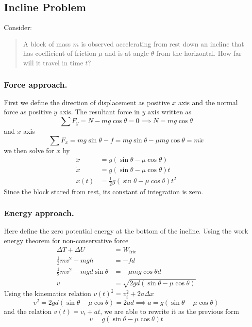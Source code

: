 \documentclass[../../../main.tex]{subfiles}
\begin{document}
\subsection{Incline Problem}
Consider:
\begin{quotation}
    A block of mass $m$ is observed accelerating from rest down an incline that has coefficient of friction $\mu$ and is at angle $\theta$ from the horizontal. How far will it travel in time $t$?
\end{quotation}
\begin{figure*}[h]
    \centering
\end{figure*}

\subsubsection{Force approach.}
First we define the direction of displacement as positive $x$ axis and the normal force as positive $y$ axis. The resultant force in $y$ axis written as 
\begin{equation*}
    \sum F_y=N-mg\cos\theta=0 \implies N=mg\cos \theta
\end{equation*}
and $x$ axis
\begin{equation*}
    \sum F_x=mg\sin\theta -f= mg\sin\theta -\mu mg\cos \theta=m\ddot{x}
\end{equation*}
we then solve for $x$ by 
\begin{align*}
    \ddot{x}&=g\left(\sin\theta -\mu \cos \theta\right)\\
    \dot{x}&=g\left(\sin\theta -\mu \cos \theta\right)t\\
    x(t)&=\frac{1}{2}g\left(\sin\theta -\mu \cos \theta\right)t^2
\end{align*}
Since the block stared from rest, its constant of integration is zero.

\subsubsection{Energy approach.}
Here define the zero potential energy at the bottom of the incline. 
Using the work energy theorem for non-conservative force
\begin{align*}
    \Delta T+\Delta U&=W_\text{fric}\\
    \frac{1}{2}mv^2-mgh&=-fd\\
    \frac{1}{2}mv^2-mgd\sin\theta&=-\mu mg\cos\theta d\\
    v&=\sqrt{2gd(\sin\theta-\mu\cos\theta)}
\end{align*}
Using the kinematics relation $v(t)^2=v_i^2+2a\Delta x$ 
\begin{equation*}
    v^2=2gd(\sin\theta-\mu\cos\theta)=2ad\implies a=g(\sin\theta-\mu\cos\theta)
\end{equation*}
and the relation $v(t)=v_i+at$, we are able to rewrite it as the previous form
\begin{equation*}
   v=g(\sin\theta-\mu\cos\theta)t 
\end{equation*}
\end{document}
